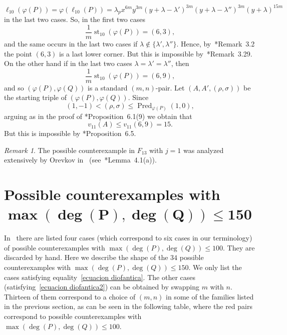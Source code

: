 \documentclass[reqno,a4paper,twoside]{amsart}
\theoremstyle{definition}
\theoremstyle{remark}
\newtheorem{remark}[theorem]{Remark}
\DeclareMathOperator{\st}{st}
\DeclareMathOperator{\Pred}{Pred}
\begin{document}
$$
\ell_{10}(\varphi(P)) = \varphi(\ell_{10}(P)) = \lambda_p x^{6m}y^{3m}(y+\lambda-\lambda')^{3m}(y+\lambda-\lambda'')^{3m} (y+\lambda)^{15m}
$$
in the last two cases. So, in the first two cases
$$
\frac{1}{m}\st_{10}(\varphi(P)) = (6,3),
$$
and the same occurs in the last two cases if $\lambda\notin\{\lambda',\lambda''\}$. Hence, by~\cite{GGV2}*{Remark~3.2} the point $(6,3)$ is a last lower corner. But this is impossible by~\cite{GGV2}*{Remark~3.29}. On the other hand if in the last two cases $\lambda = \lambda' = \lambda''$, then
$$
\frac{1}{m}\st_{10}(\varphi(P)) = (6,9),
$$
and so $(\varphi(P),\varphi(Q))$ is a standard $(m,n)$-pair. Let $(A,A',(\rho,\sigma))$ be the starting triple of $(\varphi(P),\varphi(Q))$. Since
$$
(1,-1)<(\rho,\sigma)\le \Pred_{\varphi(P)}(1,0),
$$
arguing as in the proof of \cite{GGV1}*{Proposition~6.1(9)} we obtain that
$$
v_{11}(A)\le v_{11}(6,9) = 15.
$$
But this is impossible by \cite{GGV1}*{Proposition~6.5}.

\begin{remark}
The possible counterexample in $F_{13}$ with $j=1$ was analyzed extensively by Orevkov in~\cite{O} (see~\cite{O}*{Lemma~4.1(a)}).
\end{remark}

\section[Possible counterexamples with $\max(\deg(P),\deg(Q))\le 150$]{Possible counterexamples with $\bm{\max(\deg(P),\deg(Q))\le 150}$}

In~\cite{M} there are listed four cases (which correspond to six cases in our terminology) of possible counterexamples with $\max(\deg(P),\deg(Q))\le 100$. They are discarded by hand. Here we describe the shape of the $34$ possible counterexamples with $\max(\deg(P),\deg(Q))\le 150$.  We only list the cases satisfying equality~\eqref{ecuacion diofantica}. The other cases (satisfying~\eqref{ecuacion diofantica2}) can be obtained by swapping $m$ with $n$. Thirteen of them correspond to a choice of $(m,n)$ in some of the families listed in the previous section, as can be seen in the following table, where the red pairs correspond to possible counterexamples with $\max(\deg(P),\deg(Q))\le 100$.
\end{document}
